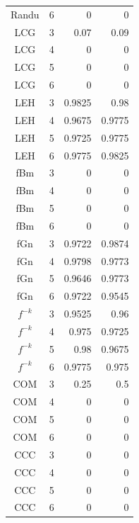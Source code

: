\begin{table}[H]
\begin{tabular}{c*{3}r}
		Randu & 6 & 0 & 0\\ 
		\cmidrule(lr){1-4}
		LCG & 3 & 0.07 & 0.09\\ 
		LCG & 4 & 0 & 0\\ 
		LCG & 5 & 0 & 0\\ 
		LCG & 6 & 0 & 0\\ 
		\cmidrule(lr){1-4}
		LEH & 3 & 0.9825 & 0.98\\ 
		LEH & 4 & 0.9675 & 0.9775\\ 
		LEH & 5 & 0.9725 & 0.9775\\ 
		LEH & 6 & 0.9775 & 0.9825\\ 
		\cmidrule(lr){1-4}
		fBm & 3 & 0 & 0\\ 
		fBm & 4 & 0 & 0\\ 
		fBm & 5 & 0 & 0\\ 
		fBm & 6 & 0 & 0\\ 
		\cmidrule(lr){1-4}
		fGn & 3 & 0.9722 & 0.9874\\ 
		fGn & 4 & 0.9798 & 0.9773\\ 
		fGn & 5 & 0.9646 & 0.9773\\ 
		fGn & 6 & 0.9722 & 0.9545\\
		\cmidrule(lr){1-4}
		$f^{-k}$ & 3 & 0.9525 & 0.96\\ 
		$f^{-k}$ & 4 & 0.975 & 0.9725\\ 
		$f^{-k}$ & 5 & 0.98 & 0.9675\\ 
		$f^{-k}$ & 6 & 0.9775 & 0.975\\
		\cmidrule(lr){1-4}
		COM & 3 & 0.25 & 0.5\\ 
		COM & 4 & 0 & 0\\ 
		COM & 5 & 0 & 0\\ 
		COM & 6 & 0 & 0\\ 
		\cmidrule(lr){1-4}
		CCC & 3 & 0 & 0\\ 
		CCC & 4 & 0 & 0\\ 
		CCC & 5 & 0 & 0\\ 
		CCC & 6 & 0 & 0\\
		\bottomrule
	\end{tabular}
\end{table}



